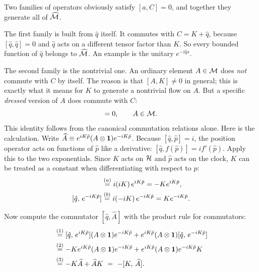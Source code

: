 Two families of operators obviously satisfy $[a,C]=0$, and together they generate all of $\widehat{\mathcal{M}}$.

The first family is built from $\hat q$ itself. It commutes with $C=K+\hat q$, because $[\hat q,\hat q]=0$ and
$\hat q$ acts on a different tensor factor than $K$. So every bounded function of $\hat q$ belongs to
$\widehat{\mathcal{M}}$. An example is the unitary $e^{-i\hat qs}$.

The second family is the nontrivial one. An ordinary element $A\in\mathcal{M}$ does \emph{not} commute with $C$ by
itself. The reason is that $[A,K]\ne0$ in general; this is exactly what it means for $K$ to generate a
nontrivial flow on $A$. But a specific \emph{dressed} version of $A$ does commute with $C$:
\begin{equation}
[e^{iK\hat p}Ae^{-iK\hat p},\,C] = 0, \qquad A\in\M .
\label{eq:cp-dressed}
\end{equation}
This identity follows from the canonical commutation relations alone. Here is the calculation. Write
$\widehat A \equiv e^{iK\hat p}(A\otimes\mathbf{1})e^{-iK\hat p}$. Because $[\hat q,\hat p]=i$, the position operator
acts on functions of $\hat p$ like a derivative:
$[\hat q, f(\hat p)] = i f'(\hat p)$. Apply this to the two exponentials. Since $K$ acts on $\mathcal{H}$ and $\hat p$
acts on the clock, $K$ can be treated as a constant when differentiating with respect to $p$:
\begin{align}
[\hat q, \, e^{iK\hat p}] &\eqstep{a} i(iK)\,e^{iK\hat p} = -K e^{iK\hat p}, \notag\\
[\hat q, \, e^{-iK\hat p}] &\eqstep{b} i(-iK)\,e^{-iK\hat p} = K e^{-iK\hat p} . \notag
\end{align}
\quad
{}

Now compute the commutator $[\hat q, \widehat A]$ with the product rule for commutators:
\begin{align}
[\hat q, \, \widehat A]
&\eqstep{1} [\hat q, \, e^{iK\hat p}](A\otimes\id)e^{-iK\hat p} + e^{iK\hat p}(A\otimes\id)[\hat q, \, e^{-iK\hat p}] \notag\\
&\eqstep{2} -K e^{iK\hat p}(A\otimes\id)e^{-iK\hat p} + e^{iK\hat p}(A\otimes\id) e^{-iK\hat p} K \notag\\
&\eqstep{3} -K \widehat A + \widehat A K \ =\ -[K, \, \widehat A] . \notag
\end{align}
\quad
{}\quad
{}

